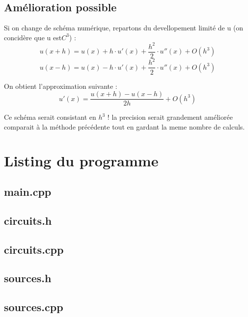 \documentclass[a4paper,11pt]{article}
\begin{document}
\subsection{Amélioration possible}
Si on change de schéma numérique, repartons du devellopement limité de u (on concidère que u est$ C^3$) :\\
\begin{equation*}
 u(x+h)=u(x)+h\cdot u'(x)+\frac{h^2}{2}\cdot u''(x)+O(h^3)
\end{equation*}
\begin{equation*}
 u(x-h)=u(x)-h\cdot u'(x)+\frac{h^2}{2}\cdot u''(x)+O(h^3)
\end{equation*}

On obtient l'approximation suivante :
\begin{equation*}
u'(x)=\frac{u(x+h)-u(x-h)}{2h}+O(h^3)
\end{equation*}

Ce schéma serait consistant en $h^3$ ! la precision serait grandement améliorée comparait à la méthode précédente tout en gardant la meme nombre de calculs. 

  \newpage
  \appendix
  \section{Listing du programme}
  \subsection{main.cpp}
    
    \newpage
  \subsection{circuits.h}
    
    \newpage
  \subsection{circuits.cpp}
    
    \newpage
   \subsection{sources.h}
    
    \newpage
   \subsection{sources.cpp}
    
    \newpage

\end{document}
